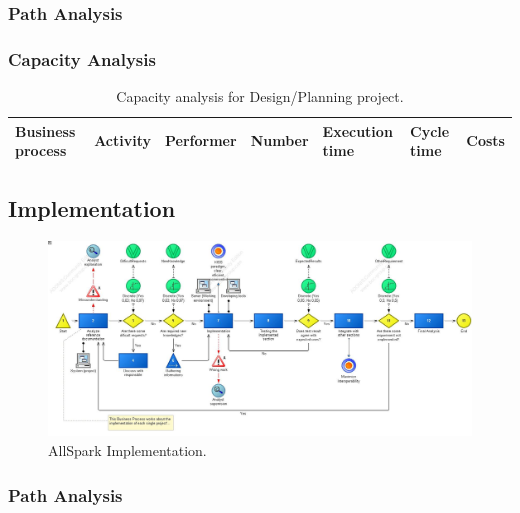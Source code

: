 \subsubsection{Path Analysis}

\begin{alltt}

\end{alltt}


\subsubsection{Capacity Analysis}


\begin{landscape}
\begin{table}
\centering
{\tiny
\begin{tabular}{|l|l|l|l|l|l|l|}
Business process&Activity&Performer&Number&Execution time&Cycle time&Costs\\
\hline

\end{tabular}
}
\caption{Capacity analysis for Design/Planning project.}
\end{table}
\end{landscape}
%

%

\subsection{Implementation}

\begin{figure}[ht!]
\begin{centering}
\includegraphics[scale=0.30, angle=90]{assign2/adonis/imgs/implementation.jpg}
\caption{AllSpark Implementation.}
\label{2img:implementation}
\end{centering}
\end{figure}


\subsubsection{Path Analysis}

